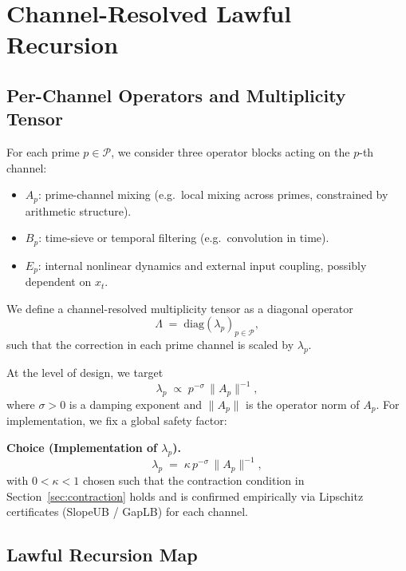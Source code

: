 \documentclass[11pt]{article}
\begin{document}
\section{Channel-Resolved Lawful Recursion}

\subsection{Per-Channel Operators and Multiplicity Tensor}

For each prime $p \in \mathcal{P}$, we consider three operator blocks acting on the $p$-th channel:
\begin{itemize}[leftmargin=1.5em]
  \item $A_p$: prime-channel mixing (e.g.\ local mixing across primes, constrained by arithmetic structure).
  \item $B_p$: time-sieve or temporal filtering (e.g.\ convolution in time).
  \item $E_p$: internal nonlinear dynamics and external input coupling, possibly dependent on $x_t$.
\end{itemize}

We define a channel-resolved multiplicity tensor as a diagonal operator
\begin{equation}
  \Lambda \;=\; \mathrm{diag}(\lambda_p)_{p \in \mathcal{P}},
\end{equation}
such that the correction in each prime channel is scaled by $\lambda_p$.

At the level of design, we target
\begin{equation}
  \lambda_p \;\propto\; p^{-\sigma}\, \|A_p\|^{-1},
\end{equation}
where $\sigma > 0$ is a damping exponent and $\|A_p\|$ is the operator norm of $A_p$.
For implementation, we fix a global safety factor:

\medskip\noindent
\textbf{Choice (Implementation of $\lambda_p$).}
\begin{equation}
  \lambda_p \;=\; \kappa \, p^{-\sigma} \, \|A_p\|^{-1},
\end{equation}
with $0 < \kappa < 1$ chosen such that the contraction condition in Section~\ref{sec:contraction} holds and is confirmed empirically via Lipschitz certificates (SlopeUB / GapLB) for each channel.

\subsection{Lawful Recursion Map}
\end{document}
